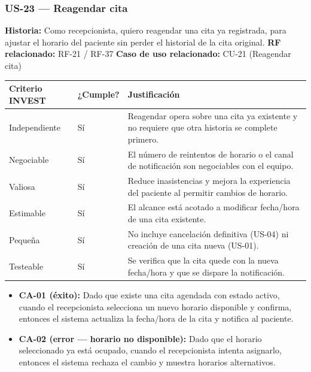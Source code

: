 \documentclass[11pt,a4paper]{article}
\providecommand{\tightlist}{%
	\setlength{\itemsep}{0pt}\setlength{\parskip}{0pt}}
\begin{document}
	
	\subsubsection{US-23 --- Reagendar cita}
	
	\textbf{Historia:} Como recepcionista, quiero reagendar una cita ya registrada, para ajustar el horario del paciente sin perder el historial de la cita original.
	\textbf{RF relacionado:} RF-21 / RF-37
	\textbf{Caso de uso relacionado:} CU-21 (Reagendar cita)
	
	\begin{longtable}{p{} p{} p{}}
		\toprule
		\textbf{Criterio INVEST} & \textbf{¿Cumple?} & \textbf{Justificación} \\
		\midrule
		\endhead
		Independiente & Sí & Reagendar opera sobre una cita ya existente y no requiere que otra historia se complete primero. \\
		Negociable & Sí & El número de reintentos de horario o el canal de notificación son negociables con el equipo. \\
		Valiosa & Sí & Reduce inasistencias y mejora la experiencia del paciente al permitir cambios de horario. \\
		Estimable & Sí & El alcance está acotado a modificar fecha/hora de una cita existente. \\
		Pequeña & Sí & No incluye cancelación definitiva (US-04) ni creación de una cita nueva (US-01). \\
		Testeable & Sí & Se verifica que la cita quede con la nueva fecha/hora y que se dispare la notificación. \\
		\bottomrule
	\end{longtable}
	
	\begin{itemize}
		\tightlist
		\item \textbf{CA-01 (éxito):} Dado que existe una cita agendada con estado activo, cuando el recepcionista selecciona un nuevo horario disponible y confirma, entonces el sistema actualiza la fecha/hora de la cita y notifica al paciente.
		\item \textbf{CA-02 (error --- horario no disponible):} Dado que el horario seleccionado ya está ocupado, cuando el recepcionista intenta asignarlo, entonces el sistema rechaza el cambio y muestra horarios alternativos.
	\end{itemize}
	
\end{document}
